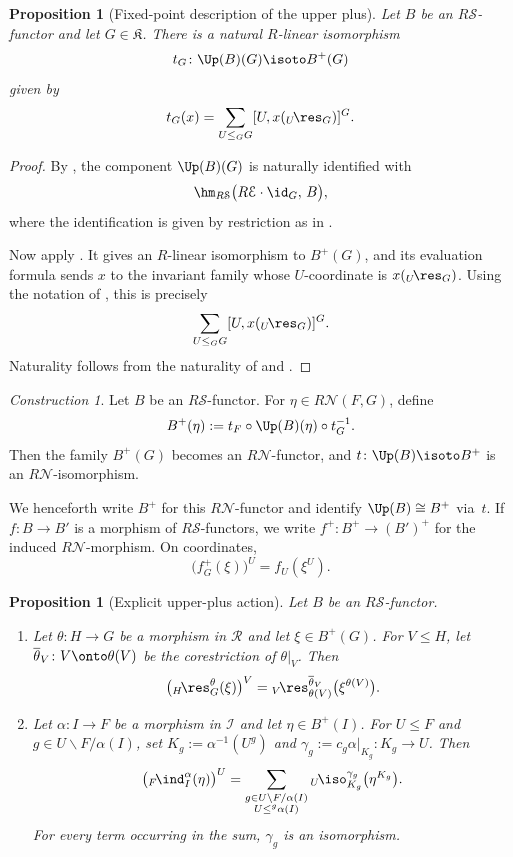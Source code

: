 \documentclass{amsart}
\numberwithin{equation}{section}%
\newtheorem{Prop}[equation]{Proposition}
\theoremstyle{remark}
\newtheorem{Cons}[equation]{Construction}
\theoremstyle{definition}
\newcommand{\e}{\mathcal E}
\newcommand{\s}{\mathcal S}
\newcommand{\n}{\mathcal N}
\newcommand{\lind}[1]{{}_{#1}\!\ind}
\newcommand{\lres}[1]{{}_{#1}\!\res}
\newcommand{\liso}[1]{{}_{#1}\!\iso}
\newcommand{\ol}[1]{\overline{#1}}
\begin{document}
%
\begin{Prop}[Fixed-point description of the upper plus]
\label{prop:upper-plus-fixed}
Let $B$ be an $R\s$-functor and let $G\in\mathfrak K$.
There is a natural $R$-linear isomorphism
%
\[
t_G\colon
\Up(B)(G)
\isoto
B^+(G)
\]
%
given by
%
\[
t_G(x)
=
\sum_{U\leq_GG}
[U,x(\lres{U}_G)]^G.
\]
\end{Prop}
%
\begin{proof}
By ,
the component $\Up(B)(G)$ is naturally identified with
\[
\hm_{R\s}
\bigl(
R\e\cdot\id_G,\,
B
\bigr),
\]
where the identification is given by restriction as in
.

Now apply
.
It gives an $R$-linear isomorphism to $B^+(G)$, and its
evaluation formula sends $x$ to the invariant family whose
$U$-coordinate is $x(\lres{U}_G)$.
Using the notation of
, this is precisely
%
\[
\sum_{U\leq_GG}[U,x(\lres{U}_G)]^G.
\]
%
Naturality follows from the naturality of
 and
.
\end{proof}
%
\begin{Cons}
\label{con:upper-plus-action}
Let $B$ be an $R\s$-functor. For $\eta\in R\n(F,G)$, define
%
\[
B^+(\eta)
:=
t_F\circ \Up(B)(\eta)\circ t_G^{-1}.
\]
%
Then the family $B^+(G)$ becomes an $R\n$-functor, and
$t\colon \Up(B)\isoto B^+$ is an $R\n$-isomorphism.

We henceforth write $B^+$ for this $R\n$-functor and identify
$\Up(B)\cong B^+$ via~$t$.
If $f\colon B\to B'$ is a morphism of $R\s$-functors, we write
$f^+\colon B^+\to (B')^+$ for the induced $R\n$-morphism. On
coordinates,
%
\[
\bigl(f_G^+(\xi)\bigr)^U=f_U(\xi^U).
\]
%
\end{Cons}
%
\begin{Prop}[Explicit upper-plus action]
\label{prop:upper-plus-action}
Let $B$ be an $R\s$-functor.

\begin{enumerate}
\item[(a)]
Let $\theta\colon H\to G$ be a morphism in $\mathcal R$
and let $\xi\in B^+(G)$.
For $V\leq H$, let
$\ol{\theta}_V\colon V\onto\theta(V)$ be the corestriction
of $\theta|_V$. Then
%
\[
\bigl(\lres{H}_G^\theta(\xi)\bigr)^V
=
\lres{V}_{\theta(V)}^{\ol{\theta}_V}
\bigl(\xi^{\theta(V)}\bigr).
\]
%
\item[(b)]
Let $\alpha\colon I\to F$ be a morphism in $\mathcal I$
and let $\eta\in B^+(I)$.
For $U\leq F$ and
$g\in U\backslash F/\alpha(I)$, set
$K_g
:=
\alpha^{-1}({U^g})$ and
$\gamma_g
:=
c_g\alpha|_{K_g}\colon K_g\to U$.
Then
%
\[
\bigl(\lind{F}_I^\alpha(\eta)\bigr)^U
=
\sum_{\substack{
		g\in U\backslash F/\alpha(I)\\
		U\leq{}^g\alpha(I)
}}
\liso{U}_{K_g}^{\gamma_g}
\bigl(\eta^{K_g}\bigr).
\]
%
For every term occurring in the sum, $\gamma_g$ is an
isomorphism.
\end{enumerate}
\end{Prop}
\end{document}
